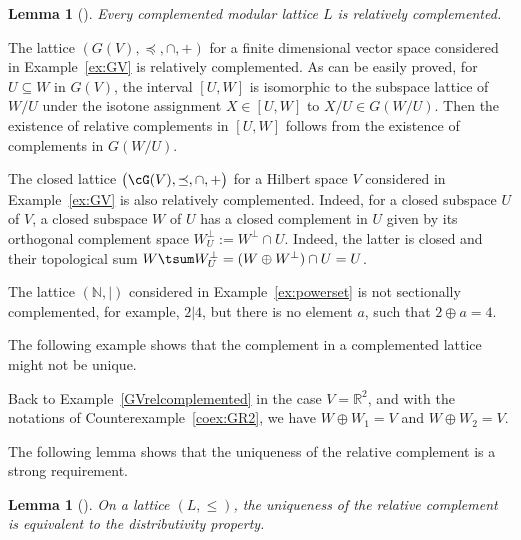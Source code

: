 \documentclass[10pt,a4paper]{amsart}
\numberwithin{equation}{section}
\newtheorem{Lemma}[Theorem]{Lemma}
\newcommand{\R}{\mathbb{R}}
\newcommand{\N}{\mathbb{N}}
\begin{document}
\begin{Lemma}[{\cite[Corollary to Theorem 11.1]{Ru}}] %
	 Every complemented modular lattice $L$ is relatively complemented.
\end{Lemma}

\begin{Example}\label{GVrelcomplemented}
The \subsp lattice $(G(V), \preceq, \cap, +)$ for a finite dimensional vector space considered in Example~\ref{ex:GV} is relatively complemented.
As can be easily proved, for $U\subseteq W$ in $G(V)$, the interval $[U, W]$ is isomorphic to the subspace lattice of $W/U$ under the isotone assignment $X\in [U,W]$ to $X/U\in G(W/U)$. Then the existence of relative complements in $[U,W]$ follows from the existence of complements in $G(W/U)$.
\end{Example}

\begin{Example}%
The closed \subsp lattice $\big(\cG(V), \preceq, \cap, +\big)$ for a Hilbert space $V$ considered in Example~\ref{ex:GV} is also relatively complemented. Indeed, for a closed subspace $U$ of $V$, a closed subspace $W$ of $U$ has a closed complement in $U$ given by its orthogonal complement space $W^\perp_U:=W^\perp\cap U$. Indeed, the latter is closed and their topological sum $W\tsum W^\perp_U=(W\oplus W^\perp)\cap U=U$.
\end{Example}

	\begin{coex}%
The lattice $(\N, \vert)$ considered in Example~\ref{ex:powerset} is not sectionally	complemented, for example, $2\vert 4$, but there is no element $a$, such that $2\oplus a=4$.	
\end{coex}
The following example shows that the complement in a complemented lattice might not be unique.

\begin{Example}%
Back to Example~\ref{GVrelcomplemented} in the case $V=\R^2$,
and with the notations of Counter\-example~\ref{coex:GR2}, we have $W\oplus W_1= V$ and $W\oplus W_2= V$.
\end{Example}
The following lemma shows that the uniqueness of the relative complement is a strong requi\-rement.

\begin{Lemma}[{\cite[Corollary 1, p.~134]{B}}] %
On a lattice $(L, \leq)$, the uniqueness of the relative complement is equivalent to the distributivity property.
\end{Lemma}
\end{document}
